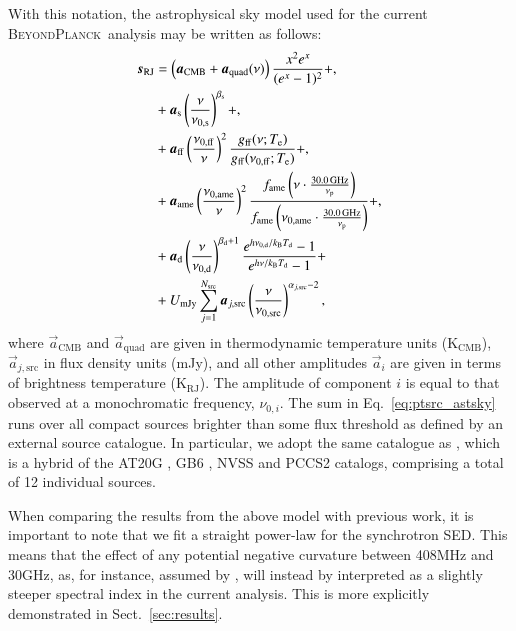 \documentclass{aa}
\def\,{\thinspace}
\def\GHz{\ifmmode \,\mathrm{GHz}\else \,GHz\fi}
\def\Tdust{\ifmmode T_\mathrm{d}\else $T_{\mathrm{d}}$\fi}
\def\bdust{\ifmmode \beta_\mathrm{d}\else $\beta_{\mathrm{d}}$\fi}
\def\bsynch{\ifmmode \beta_\mathrm{s}\else $\beta_{\mathrm{s}}$\fi}
\def\nuzeros{\ifmmode \nu_{0,\mathrm{s}}\else $\nu_{0,\mathrm{s}}$\fi}
\def\nuzeroff{\ifmmode \nu_{0,\mathrm{ff}}\else $\nu_{0,\mathrm{ff}}$\fi}
\def\nuzerod{\ifmmode \nu_{0,\mathrm{d}}\else $\nu_{0,\mathrm{d}}$\fi}
\def\nuzeroame{\ifmmode \nu_{0,\mathrm{ame}}\else $\nu_{0,\mathrm{ame}}$\fi}
\def\nuzerosrc{\ifmmode \nu_{0,\mathrm{src}}\else $\nu_{0,\mathrm{src}}$\fi}
\def\nup{\ifmmode \nu_{\mathrm{p}}\else $\nu_{\mathrm{p}}$\fi}
\def\Te{\ifmmode T_{\mathrm{e}}\else $T_{\mathrm{e}}$\fi}
\def\kB{\ifmmode k_\mathrm{B}\else $k_{\mathrm{B}}$\fi}
\newcommand{\BP}{\textsc{BeyondPlanck}}
\begin{document}
With this notation, the astrophysical sky model used for the current \BP\ analysis may be written as follows:
\begin{align}
  \vec{s}_{\mathrm{RJ}} &= \left(\vec{a}_{\mathrm{CMB}}+\vec{a}_{\mathrm{quad}}(\nu)\right) \frac{x^2 e^x}{(e^x -1)^2}+\label{eq:cmb_astsky},\\
  &+ \vec{a}_{\mathrm{s}} \left(\frac{\nu}{\nuzeros}\right)^{\bsynch} + \label{eq:synch_astsky},\\
  &+ \vec{a}_{\mathrm{ff}} \left(\frac{\nuzeroff}{\nu}\right)^2 \frac{g_{\mathrm{ff}}(\nu;\Te) }{g_{\mathrm{ff}}(\nuzeroff;\Te)} +\label{eq:ff_astsky},\\
  &+ \vec{a}_{\mathrm{ame}} \left(\frac{\nuzeroame}{\nu}\right)^2 \frac{f_{\mathrm{ame}} \left(\nu\cdot \frac{30.0\GHz}{\nup}\right)}{f_{\mathrm{ame}} \left(\nuzeroame\cdot \frac{30.0\GHz}{\nup}\right)}+ \label{eq:ame_astsky},\\
  &+ \vec{a}_{\mathrm{d}} \left(\frac{\nu}{\nuzerod}\right)^{\bdust+1} \frac{e^{h\nuzerod/\kB\Tdust}-1}{e^{h\nu/\kB\Tdust}-1}+ \label{eq:dust_astsky}\\
  &+ U_{\mathrm{mJy}} \sum_{j=1}^{N_{\mathrm{src}}} \vec{a}_{j,\mathrm{src}} \left(\frac{\nu}{\nuzerosrc}\right)^{\alpha_{j,\mathrm{src}}-2}, \label{eq:ptsrc_astsky}
\end{align}
where $\vec{a}_{\mathrm{CMB}}$ and $\vec{a}_{\mathrm{quad}}$ are given
in thermodynamic temperature units ($\mathrm{K_{CMB}}$),
$\vec{a}_{j,\mathrm{src}}$ in flux density units (mJy),
and all other amplitudes $\vec{a}_i$ are given in terms of brightness
temperature ($\mathrm{K_{RJ}}$). The amplitude
of component $i$ is equal to that observed at a monochromatic
frequency, $\nu_{0,i}$. The sum in Eq.~\eqref{eq:ptsrc_astsky} runs over
all compact sources brighter than some flux threshold as defined by an
external source catalogue. In particular, we adopt the same catalogue
as \citet{planck2016-l04}, which is a hybrid of the AT20G
\citep{murphy2010}, GB6 \citep{gregory1996}, NVSS \citep{condon1998}
and PCCS2 \citep{planck2014-a35} catalogs, comprising a total of
12\,192 individual sources.

When comparing the results from the above model with previous work, it
is important to note that we fit a straight power-law for the
synchrotron SED. This means that the effect of any potential negative
curvature between 408\,MHz and 30\,GHz, as, for instance, assumed by
\citet{planck2014-a12}, will instead by interpreted as a slightly
steeper spectral index in the current analysis. This is more
explicitly demonstrated in Sect.~\ref{sec:results}.
\end{document}
